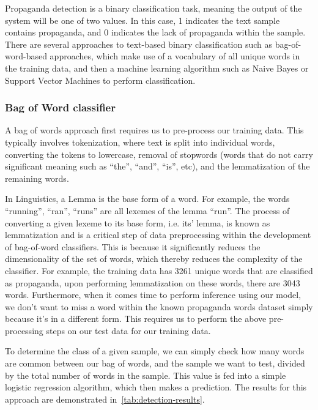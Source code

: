 \documentclass[twocolumn]{article}
\begin{document}
Propaganda detection is a binary classification task, meaning the output of the system will be one of two values. In this case, 1 indicates the text sample contains propaganda, and 0 indicates the lack of propaganda within the sample. There are several approaches to text-based binary classification such as bag-of-word-based approaches, which make use of a vocabulary of all unique words in the training data, and then a machine learning algorithm such as Naive Bayes or Support Vector Machines to perform classification.

\subsubsection{Bag of Word classifier}

A bag of words approach first requires us to pre-process our training data. This typically involves tokenization, where text is split into individual words, converting the tokens to lowercase, removal of stopwords (words that do not carry significant meaning such as ``the'', ``and'', ``is'', etc), and the lemmatization of the remaining words. 

In Linguistics, a Lemma is the base form of a word. For example, the words ``running'', ``ran'', ``runs'' are all lexemes of the lemma ``run''. The process of converting a given lexeme to its base form, i.e. its' lemma, is known as lemmatization and is a critical step of data preprocessing within the development of bag-of-word classifiers. This is because it significantly reduces the dimensionality of the set of words, which thereby reduces the complexity of the classifier. For example, the training data has 3261 unique words that are classified as propaganda, upon performing lemmatization on these words, there are 3043 words. Furthermore, when it comes time to perform inference using our model, we don't want to miss a word within the known propaganda words dataset simply because it's in a different form. This requires us to perform the above pre-processing steps on our test data for our training data. 

To determine the class of a given sample, we can simply check how many words are common between our bag of words, and the sample we want to test, divided by the total number of words in the sample. This value is fed into a simple logistic regression algorithm, which then makes a prediction. The results for this approach are demonstrated in~\ref{tab:detection-results}. 
\end{document}
